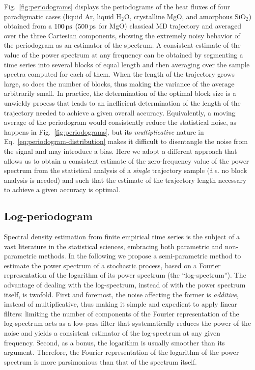 Fig.~\ref{fig:periodograms} displays the periodograms of the heat fluxes of four paradigmatic cases (liquid Ar, liquid H$_2$O, crystalline MgO, and amorphous SiO$_2$) obtained from a $100\,\mathrm{ps}$ ($500\,\mathrm{ps}$ for MgO) classical MD trajectory and averaged over the three Cartesian components, showing the extremely noisy behavior of the periodogram as an estimator of the spectrum. 
A consistent estimate of the value of the power spectrum at any frequency can be obtained by segmenting a time series into several blocks of equal length and then averaging over the sample spectra computed for each of them. When the length of the trajectory grows large, so does the number of blocks, thus making the variance of the average arbitrarily small. In practice, the determination of the optimal block size is a unwieldy process that leads to an inefficient determination of the length of the trajectory needed to achieve a given overall accuracy. 
Equivalently, a moving average \cite{MovingAverage} of the periodogram would consistently reduce the statistical noise, as happens in Fig.~\ref{fig:periodograms}, but its \emph{multiplicative} nature in Eq.~\eqref{eq:periodogram-distribution} makes it difficult to disentangle the noise from the signal and may introduce a bias. 
Here we adopt a different approach that allows us to obtain a consistent estimate of the zero-frequency value of the power spectrum from the statistical analysis of a \emph{single} trajectory sample (\emph{i.e.} no block analysis is needed) and such that the estimate of the trajectory length necessary to achieve a given accuracy is optimal.

\subsection{Log-periodogram}
Spectral density estimation from finite empirical time series is the subject of a vast literature in the statistical sciences, embracing both parametric and non-parametric methods.\cite{Stoica2005} In the following we propose a semi-parametric method to estimate the power spectrum of a stochastic process, based on a Fourier representation of the logarithm of its power spectrum (the ``log-spectrum''). The advantage of dealing with the log-spectrum, instead of with the power spectrum itself, is twofold. First and foremost, the noise affecting the former is \emph{additive}, instead of multiplicative, thus making it simple and expedient to apply linear filters: limiting the number of components of the Fourier representation of the log-spectrum acts as a low-pass filter that systematically reduces the power of the noise and yields a consistent estimator of the log-spectrum at any given frequency. Second, as a bonus, the logarithm is usually smoother than its argument. Therefore, the Fourier representation of the logarithm of the power spectrum is more parsimonious than that of the spectrum itself.

